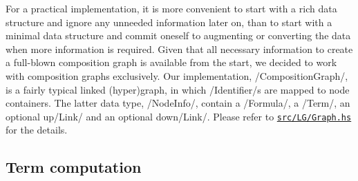 \documentclass[12pt,a4paper]{article}
\newcommand{\coderef}[1]{\href{https://github.com/jgonggrijp/net-prove/blob/report/#1}{\texttt{#1}}}
\begin{document}
For a practical implementation, it is more convenient to start with a rich data structure and ignore any unneeded information later on, than to start with a minimal data structure and commit oneself to augmenting or converting the data when more information is required. Given that all necessary information to create a full-blown composition graph is available from the start, we decided to work with composition graphs exclusively. Our implementation, \hs/CompositionGraph/, is a fairly typical linked (hyper)graph, in which \hs/Identifier/s are mapped to node containers. The latter data type, \hs/NodeInfo/, contain a \hs/Formula/, a \hs/Term/, an optional up\hs/Link/ and an optional down\hs/Link/. Please refer to \coderef{src/LG/Graph.hs} for the details.


\subsection{Term computation}
\end{document}
